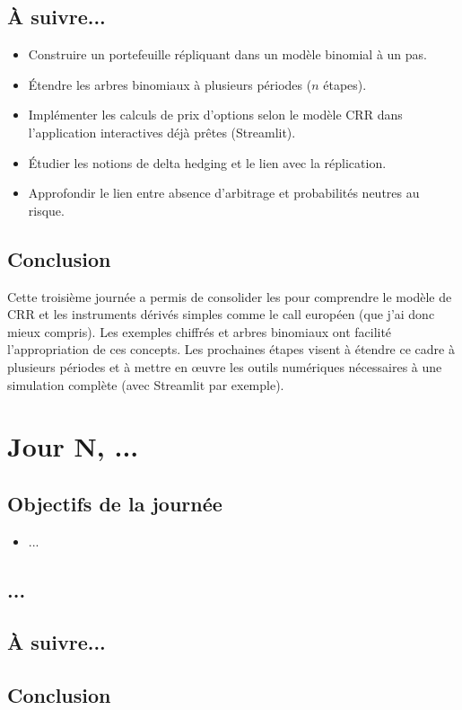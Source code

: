 \documentclass[a4paper,11pt]{article}
\begin{document}
\subsection{À suivre...}
\begin{itemize}
    \item Construire un portefeuille répliquant dans un modèle binomial à un pas.
    \item Étendre les arbres binomiaux à plusieurs périodes ($n$ étapes).
    \item Implémenter les calculs de prix d’options selon le modèle CRR dans l'application interactives déjà prêtes (Streamlit).
    \item Étudier les notions de delta hedging et le lien avec la réplication.
    \item Approfondir le lien entre absence d’arbitrage et probabilités neutres au risque.
\end{itemize}

\subsection{Conclusion}
Cette troisième journée a permis de consolider les pour comprendre le modèle de CRR et les instruments dérivés simples comme le call européen (que j'ai donc mieux compris). Les exemples chiffrés et arbres binomiaux ont facilité l’appropriation de ces concepts. Les prochaines étapes visent à étendre ce cadre à plusieurs périodes et à mettre en œuvre les outils numériques nécessaires à une simulation complète (avec Streamlit par exemple).

\newpage


\section{Jour N, ...}
\subsection{Objectifs de la journée}
\begin{itemize}
    \item ...
\end{itemize}
\subsection{...}
\subsection{À suivre...}
\subsection{Conclusion}
\newpage

\end{document}
